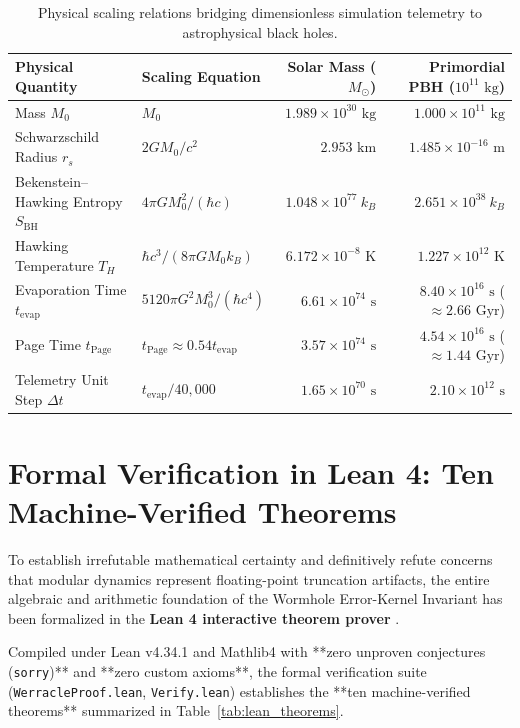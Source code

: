 \documentclass[11pt,a4paper]{article}
\begin{document}
\begin{table}[h]
\centering\small
\caption{Physical scaling relations bridging dimensionless simulation telemetry to astrophysical black holes.}\label{tab:physical_scaling}
\begin{tabularx}{\linewidth}{@{}lXrr@{}}
\toprule
\textbf{Physical Quantity} & \textbf{Scaling Equation} & \textbf{Solar Mass ($M_\odot$)} & \textbf{Primordial PBH ($10^{11}\text{ kg}$)} \\
\midrule
Mass $M_0$ & $M_0$ & $1.989 \times 10^{30}\text{ kg}$ & $1.000 \times 10^{11}\text{ kg}$ \\
Schwarzschild Radius $r_s$ & $2GM_0 / c^2$ & $2.953\text{ km}$ & $1.485 \times 10^{-16}\text{ m}$ \\
Bekenstein--Hawking Entropy $S_{\text{BH}}$ & $4\pi G M_0^2 / (\hbar c)$ & $1.048 \times 10^{77}\ k_B$ & $2.651 \times 10^{38}\ k_B$ \\
Hawking Temperature $T_H$ & $\hbar c^3 / (8\pi G M_0 k_B)$ & $6.172 \times 10^{-8}\text{ K}$ & $1.227 \times 10^{12}\text{ K}$ \\
Evaporation Time $t_{\text{evap}}$ & $5120 \pi G^2 M_0^3 / (\hbar c^4)$ & $6.61 \times 10^{74}\text{ s}$ & $8.40 \times 10^{16}\text{ s}$ ($\approx 2.66\text{ Gyr}$) \\
Page Time $t_{\text{Page}}$ & $t_{\text{Page}} \approx 0.54 t_{\text{evap}}$ & $3.57 \times 10^{74}\text{ s}$ & $4.54 \times 10^{16}\text{ s}$ ($\approx 1.44\text{ Gyr}$) \\
Telemetry Unit Step $\Delta t$ & $t_{\text{evap}} / 40{,}000$ & $1.65 \times 10^{70}\text{ s}$ & $2.10 \times 10^{12}\text{ s}$ \\
\bottomrule
\end{tabularx}
\end{table}

\section{Formal Verification in Lean 4: Ten Machine-Verified Theorems}\label{sec:lean}
To establish irrefutable mathematical certainty and definitively refute concerns that modular dynamics represent floating-point truncation artifacts, the entire algebraic and arithmetic foundation of the Wormhole Error-Kernel Invariant has been formalized in the \textbf{Lean 4 interactive theorem prover} \cite{werr_lean}.

Compiled under Lean v4.34.1 and Mathlib4 with **zero unproven conjectures (\texttt{sorry})** and **zero custom axioms**, the formal verification suite (\texttt{WerracleProof.lean}, \texttt{Verify.lean}) establishes the **ten machine-verified theorems** summarized in Table~\ref{tab:lean_theorems}.
\end{document}
